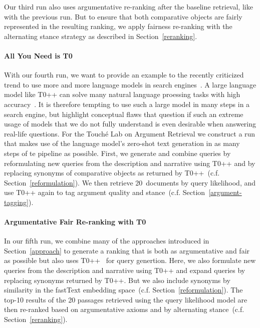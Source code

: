 Our third run also uses argumentative re-ranking after the baseline retrieval, like with the previous run. But to ensure that both comparative objects are fairly represented in the resulting ranking, we apply fairness re-ranking with the alternating stance strategy as described in Section~\ref{reranking}.

\paragraph{All You Need is T0}

With our fourth run, we want to provide an example to the recently criticized trend to use more and more language models in search engines~\cite{ShahB2022}.
A large language model like T0++ can solve many natural language proessing tasks with high accuracy~\cite{SanhWRBSACSLRDBXTSSKCNDCJWMSYPBWNRSSFFTBGBWR2021}.
It is therefore tempting to use such a large model in many steps in a search engine, but \citet{ShahB2022} highlight conceptual flaws that question if such an extreme usage of models that we do not fully understand is even desirable when answering real-life questions.
For the Touché Lab on Argument Retrieval we construct a run that makes use of the language model's zero-shot text generation in as many steps of te pipeline as possible.
First, we generate and combine queries by reformulating new queries from the description and narrative using T0++ and by replacing synonyms of comparative objects as returned by T0++~(c.f. Section~\ref{reformulation}).
We then retrieve 20~documents by query likelihood, and use T0++ again to tag argument quality and stance~(c.f. Section~\ref{argument-tagging}).

\paragraph{Argumentative Fair Re-ranking with T0}

In our fifth run, we combine many of the approaches introduced in Section~\ref{approach} to generate a ranking that is both as argumentative and fair as possible but also uses T0++~\cite{SanhWRBSACSLRDBXTSSKCNDCJWMSYPBWNRSSFFTBGBWR2021} for query genertion.
Here, we also formulate new queries from the description and narrative using T0++ and expand queries by replacing synonyms returned by T0++. But we also include synonyms by similarity in the fastText embedding space~(c.f. Section~\ref{reformulation}).
The top-10 results of the 20 passages retrieved using the query likelihood model are then re-ranked based on argumentative axioms and by alternating stance~(c.f. Section~\ref{reranking}).

